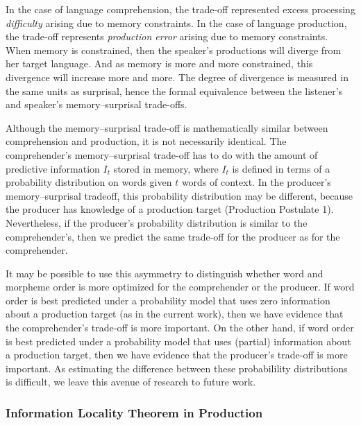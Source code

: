 \documentclass[11pt,letterpaper]{article}
\begin{document}
In the case of language comprehension, the trade-off represented excess processing \emph{difficulty} arising due to memory constraints. In the case of language production, the trade-off represents \emph{production error} arising due to memory constraints. When memory is constrained, then the speaker's productions will diverge from her target language. And as memory is more and more constrained, this divergence will increase more and more. The degree of divergence is measured in the same units as surprisal, hence the formal equivalence between the listener's and speaker's memory--surprisal trade-offs. 

Although the memory--surprisal trade-off is mathematically similar between comprehension and production, it is not necessarily identical. The comprehender's memory--surprisal trade-off has to do with the amount of predictive information $I_t$ stored in memory, where $I_t$ is defined in terms of a probability distribution on words given $t$ words of context. In the producer's memory--surprisal tradeoff, this probability distribution may be different, because the producer has knowledge of a production target (Production Postulate 1). Nevertheless, if the producer's probability distribution is similar to the comprehender's, then we predict the same trade-off for the producer as for the comprehender.

It may be possible to use this asymmetry to distinguish whether word and morpheme order is more optimized for the comprehender or the producer. If word order is best predicted under a probability model that uses zero information about a production target (as in the current work), then we have evidence that the comprehender's trade-off is more important. On the other hand, if word order is best predicted under a probability model that uses (partial) information about a production target, then we have evidence that the producer's trade-off is more important. As estimating the difference between these probabilility distributions is difficult, we leave this avenue of research to future work.


\subsubsection{Information Locality Theorem in Production}\label{sec:proof-prod}
\end{document}
